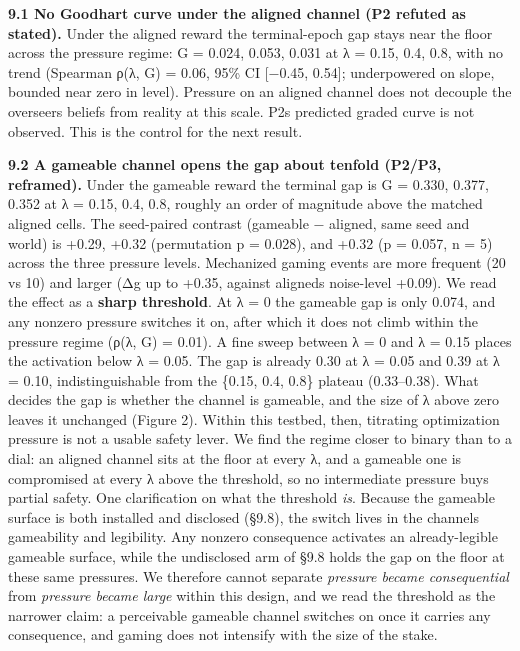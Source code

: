 \documentclass[11pt]{article}
\begin{document}
\textbf{9.1 No Goodhart curve under the aligned channel (P2 refuted as
stated).} Under the aligned reward the terminal-epoch gap stays near the
floor across the pressure regime: G = 0.024, 0.053, 0.031 at λ = 0.15,
0.4, 0.8, with no trend (Spearman ρ(λ, G) = 0.06, 95\% CI {[}−0.45,
0.54{]}; underpowered on slope, bounded near zero in level). Pressure on
an aligned channel does not decouple the overseer\textquotesingle s
beliefs from reality at this scale. P2\textquotesingle s predicted
graded curve is not observed. This is the control for the next result.

\textbf{9.2 A gameable channel opens the gap about tenfold (P2/P3,
reframed).} Under the gameable reward the terminal gap is G = 0.330,
0.377, 0.352 at λ = 0.15, 0.4, 0.8, roughly an order of magnitude above
the matched aligned cells. The seed-paired contrast (gameable − aligned,
same seed and world) is +0.29, +0.32 (permutation p = 0.028), and +0.32
(p = 0.057, n = 5) across the three pressure levels. Mechanized gaming
events are more frequent (20 vs 10) and larger (Δg up to +0.35, against
aligned\textquotesingle s noise-level +0.09). We read the effect as a
\textbf{sharp threshold}. At λ = 0 the gameable gap
is only 0.074, and any nonzero pressure switches it on, after which it
does not climb within the pressure regime (ρ(λ, G) = 0.01). A fine sweep
between λ = 0 and λ = 0.15 places the activation below λ = 0.05. The gap
is already 0.30 at λ = 0.05 and 0.39 at λ = 0.10, indistinguishable from
the \{0.15, 0.4, 0.8\} plateau (0.33--0.38). What decides the gap is
whether the channel is gameable, and the size of λ above zero leaves it
unchanged (Figure 2). Within this testbed, then, titrating optimization
pressure is not a usable safety lever. We find the regime closer to binary than
to a dial: an aligned channel sits at the floor at every λ, and a
gameable one is compromised at every λ above the threshold, so no
intermediate pressure buys partial safety. One clarification on what the
threshold \emph{is}. Because the gameable surface is both installed and
disclosed (§9.8), the switch lives in the channel\textquotesingle s
gameability and legibility. Any
nonzero consequence activates an already-legible gameable surface, while
the undisclosed arm of §9.8 holds the gap on the floor at these same
pressures. We therefore cannot separate \emph{pressure became
consequential} from \emph{pressure became large} within this design, and
we read the threshold as the narrower claim: a perceivable gameable
channel switches on once it carries any consequence, and gaming does not
intensify with the size of the stake.
\end{document}
